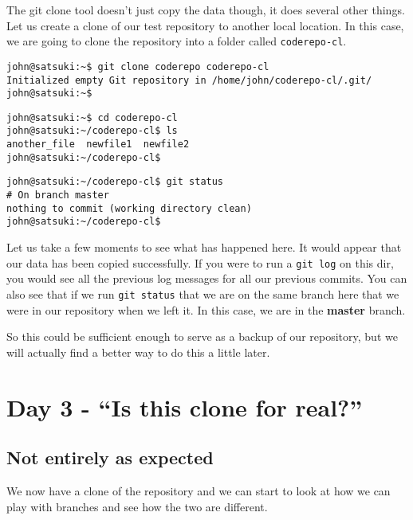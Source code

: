 The git clone tool doesn't just copy the data though, it does several other things.  Let us create a clone of our test repository to another local location.  In this case, we are going to clone the repository into a folder called \texttt{coderepo-cl}.

\begin{Verbatim}
john@satsuki:~$ git clone coderepo coderepo-cl
Initialized empty Git repository in /home/john/coderepo-cl/.git/
john@satsuki:~$ 
\end{Verbatim}

\begin{Verbatim}
john@satsuki:~$ cd coderepo-cl
john@satsuki:~/coderepo-cl$ ls 
another_file  newfile1  newfile2
john@satsuki:~/coderepo-cl$
\end{Verbatim}

\begin{Verbatim}
john@satsuki:~/coderepo-cl$ git status
# On branch master
nothing to commit (working directory clean)
john@satsuki:~/coderepo-cl$ 
\end{Verbatim}

Let us take a few moments to see what has happened here.  It would appear that our data has been copied successfully.  If you were to run a \texttt{git log} on this dir, you would see all the previous log messages for all our previous commits.  You can also see that if we run \texttt{git status} that we are on the same branch here that we were in our repository when we left it.  In this case, we are in the \textbf{master} branch.

So this could be sufficient enough to serve as a backup of our repository, but we will actually find a better way to do this a little later.

\section{Day 3 - ``Is this clone for real?''}
\subsection{Not entirely as expected}

We now have a clone of the repository and we can start to look at how we can play with branches and see how the two are different.

